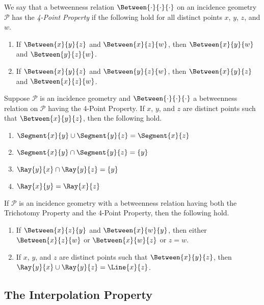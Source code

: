 \documentclass{article}
\begin{document}
\begin{dfn}
We say that a betweenness relation $\Between{\cdot}{\cdot}{\cdot}$ on an incidence geometry $\mathcal{P}$ has the \emph{4-Point Property} if the following hold for all distinct points $x$, $y$, $z$, and $w$.
\begin{enumerate}
\item If $\Between{x}{y}{z}$ and $\Between{x}{z}{w}$, then $\Between{x}{y}{w}$ and $\Between{y}{z}{w}$.
\item If $\Between{x}{y}{z}$ and $\Between{y}{z}{w}$, then $\Between{x}{y}{z}$ and $\Between{x}{z}{w}$.
\end{enumerate}
\end{dfn}

\begin{prop}
Suppose $\mathcal{P}$ is an incidence geometry and $\Between{\cdot}{\cdot}{\cdot}$ a betweenness relation on $\mathcal{P}$ having the 4-Point Property. If $x$, $y$, and $z$ are distinct points such that $\Between{x}{y}{z}$, then the following hold.
\begin{enumerate}
\item $\Segment{x}{y} \cup \Segment{y}{z} = \Segment{x}{z}$
\item $\Segment{x}{y} \cap \Segment{y}{z} = \{y\}$
\item $\Ray{y}{x} \cap \Ray{y}{z} = \{y\}$
\item $\Ray{x}{y} = \Ray{x}{z}$
\end{enumerate}
\end{prop}

\begin{prop}
If $\mathcal{P}$ is an incidence geometry with a betweenness relation having both the Trichotomy Property and the 4-Point Property, then the following hold.
\begin{enumerate}
\item If $\Between{x}{z}{y}$ and $\Between{x}{w}{y}$, then either $\Between{x}{z}{w}$ or $\Between{x}{w}{z}$ or $z = w$.
\item If $x$, $y$, and $z$ are distinct points such that $\Between{x}{y}{z}$, then $\Ray{y}{x} \cup \Ray{y}{z} = \Line{x}{z}$.
\end{enumerate}
\end{prop}



\subsection*{The Interpolation Property}
\end{document}
